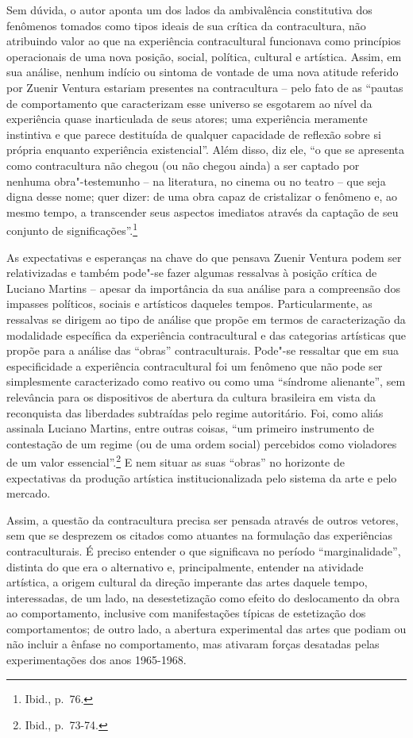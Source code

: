 Sem dúvida, o autor aponta um dos lados da ambivalência constitutiva dos
fenômenos tomados como tipos ideais de sua crítica da contracultura, não
atribuindo valor ao que na experiência contracultural funcionava como
princípios operacionais de uma nova posição, social, política, cultural
e artística. Assim, em sua análise, nenhum indício ou sintoma de vontade
de uma nova atitude referido por Zuenir Ventura estariam presentes na
contracultura -- pelo fato de as ``pautas de comportamento que
caracterizam esse universo se esgotarem ao nível da experiência quase
inarticulada de seus atores; uma experiência meramente instintiva e que
parece destituída de qualquer capacidade de reflexão sobre si própria
enquanto experiência existencial''. Além disso, diz ele, ``o que se
apresenta como contracultura não chegou (ou não chegou ainda) a ser
captado por nenhuma obra"-testemunho -- na literatura, no cinema ou no
teatro -- que seja digna desse nome; quer dizer: de uma obra capaz de
cristalizar o fenômeno e, ao mesmo tempo, a transcender seus aspectos
imediatos através da captação de seu conjunto de
significações''.\footnote{Ibid., p.~76.}

As expectativas e esperanças na chave do que pensava Zuenir Ventura
podem ser relativizadas e também pode"-se fazer algumas ressalvas à
posição crítica de Luciano Martins -- apesar da importância da sua
análise para a compreensão dos impasses políticos, sociais e artísticos
daqueles tempos. Particularmente, as ressalvas se dirigem ao tipo de
análise que propõe em termos de caracterização da modalidade específica
da experiência contracultural e das categorias artísticas que propõe
para a análise das ``obras'' contraculturais. Pode"-se ressaltar que em
sua especificidade a experiência contracultural foi um fenômeno que não
pode ser simplesmente caracterizado como reativo ou como uma ``síndrome
alienante'', sem relevância para os dispositivos de abertura da cultura
brasileira em vista da reconquista das liberdades subtraídas pelo regime
autoritário. Foi, como aliás assinala Luciano Martins, entre outras
coisas, ``um primeiro instrumento de contestação de um regime (ou de uma
ordem social) percebidos como violadores de um valor
essencial''.\footnote{Ibid., p.~73-74.} E nem situar as suas ``obras''
no horizonte de expectativas da produção artística institucionalizada
pelo sistema da arte e pelo mercado.

Assim, a questão da contracultura precisa ser pensada através de outros
vetores, sem que se desprezem os citados como atuantes na formulação das
experiências contraculturais. É preciso entender o que significava no
período ``marginalidade'', distinta do que era o alternativo e,
principalmente, entender na atividade artística, a origem cultural da
direção imperante das artes daquele tempo, interessadas, de um lado, na
desestetização como efeito do deslocamento da obra ao comportamento,
inclusive com manifestações típicas de estetização dos comportamentos;
de outro lado, a abertura experimental das artes que podiam ou não
incluir a ênfase no comportamento, mas ativaram forças desatadas pelas
experimentações dos anos 1965-1968.

